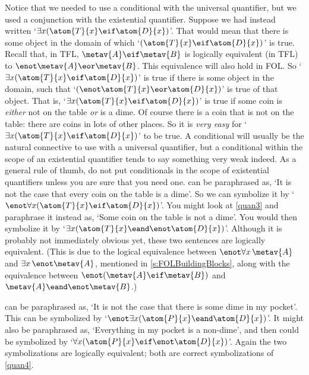 Notice that we needed to use a conditional with the universal quantifier, but we used a conjunction with the existential quantifier. Suppose we had instead written `$\exists x(\atom{T}{x} \eif \atom{D}{x})$'. That would mean that there is some object in the domain of which `$(\atom{T}{x} \eif \atom{D}{x})$' is true. Recall that, in TFL, $\metav{A} \eif \metav{B}$ is logically equivalent (in TFL) to $\enot\metav{A} \eor \metav{B}$. This equivalence will also hold in FOL. So `$\exists x(\atom{T}{x} \eif \atom{D}{x})$' is true if there is some object in the domain, such that `$(\enot \atom{T}{x} \eor \atom{D}{x})$' is true of that object. That is, `$\exists x (\atom{T}{x} \eif \atom{D}{x})$' is true if some coin is \emph{either} not on the table \emph{or} is a dime. Of course there is a coin that is not on the table: there are coins in  lots of other places. So it is \emph{very easy} for `$\exists x(\atom{T}{x} \eif \atom{D}{x})$' to be true. A conditional will usually be the natural connective to use with a universal quantifier, but a conditional within the scope of an existential quantifier tends to say something very weak indeed. As a general rule of thumb, do not put conditionals in the scope of existential quantifiers unless you are sure that you need one.
 can be paraphrased as, `It is not the case that every coin on the table is a dime'. So we can symbolize it by `$\enot \forall x(\atom{T}{x} \eif \atom{D}{x})$'. You might look at \cref*{quan3} and paraphrase it instead as, `Some coin on the table is not a dime'. You would then symbolize it by `$\exists x(\atom{T}{x} \eand \enot \atom{D}{x})$'. Although it is probably not immediately obvious yet, these two sentences are logically equivalent. (This is due to the logical equivalence between $\enot\forall x\,\metav{A}$ and $\exists x\,\enot\metav{A}$, mentioned in \cref{s:FOLBuildingBlocks}, along with the equivalence between $\enot(\metav{A}\eif\metav{B})$ and $\metav{A}\eand\enot\metav{B}$.)

 can be paraphrased as, `It is not the case that there is some dime in my pocket'. This can be symbolized by `$\enot\exists x(\atom{P}{x} \eand \atom{D}{x})$'. It might also be paraphrased as, `Everything in my pocket is a non-dime', and then could be symbolized by `$\forall x(\atom{P}{x} \eif \enot \atom{D}{x})$'. Again the two symbolizations are logically equivalent; both are correct symbolizations of \cref*{quan4}.

